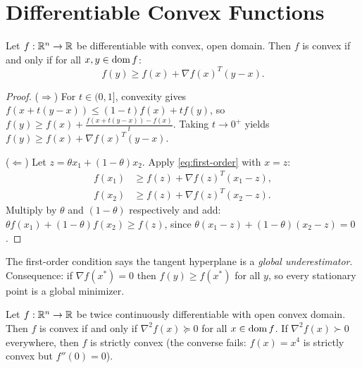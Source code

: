\documentclass[11pt,a4paper]{article}
\begin{document}
\section{Differentiable Convex Functions}

\begin{theorem}
\label{thm:first-order}
Let $f : \mathbb{R}^n \to \mathbb{R}$ be differentiable with convex, open domain.  Then $f$
is convex if and only if for all $x, y \in \operatorname{dom} f$:
\begin{equation}
  \label{eq:first-order}
  f(y) \ge f(x) + \nabla f(x)^T (y - x).
\end{equation}
\end{theorem}

\begin{proof}
($\Rightarrow$)  For $t \in (0,1]$, convexity gives
$f(x + t(y-x)) \le (1-t) f(x) + t f(y)$, so
$f(y) \ge f(x) + \frac{f(x + t(y-x)) - f(x)}{t}$.
Taking $t \to 0^+$ yields $f(y) \ge f(x) + \nabla f(x)^T(y-x)$.

($\Leftarrow$)  Let $z = \theta x_1 + (1-\theta) x_2$.  Apply
\eqref{eq:first-order} with $x = z$:
\begin{align*}
  f(x_1) &\ge f(z) + \nabla f(z)^T(x_1 - z), \\
  f(x_2) &\ge f(z) + \nabla f(z)^T(x_2 - z).
\end{align*}
Multiply by $\theta$ and $(1-\theta)$ respectively and add:
$\theta f(x_1) + (1-\theta) f(x_2) \ge f(z)$, since
$\theta(x_1 - z) + (1-\theta)(x_2 - z) = 0$.
\end{proof}

\begin{keyresult}
The first-order condition says the tangent hyperplane is a \emph{global
underestimator}.  Consequence: if $\nabla f(x^*) = 0$ then $f(y) \ge f(x^*)$
for all $y$, so every stationary point is a global minimizer.
\end{keyresult}

\begin{theorem}
\label{thm:second-order}
Let $f : \mathbb{R}^n \to \mathbb{R}$ be twice continuously differentiable with open convex
domain.  Then $f$ is convex if and only if $\nabla^2 f(x) \succeq 0$ for all
$x \in \operatorname{dom} f$.  If $\nabla^2 f(x) \succ 0$ everywhere, then $f$ is strictly
convex (the converse fails: $f(x) = x^4$ is strictly convex but
$f''(0) = 0$).
\end{theorem}
\end{document}

